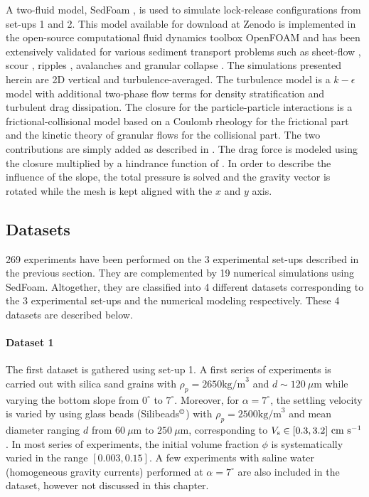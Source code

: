\documentclass[12pt]{article}
\begin{document}
A two-fluid model, SedFoam \citep{chauchat2017}, is used to simulate lock-release configurations from set-ups 1 and 2. This model available for download at Zenodo \citep{bonamy2023} is implemented in the open-source computational fluid dynamics toolbox OpenFOAM and has been extensively validated for various sediment transport problems such as sheet-flow \citep{cheng2016,chauchat2022,mathieu2021,mathieu2022}, scour \citep{nagel2020,tsai2022}, ripples \citep{salimi2021a,salimi2021b}, avalanches \citep{montella2021} and granular collapse \citep{montella2023}. The simulations presented herein are 2D vertical and turbulence-averaged. The turbulence model is a $k-\epsilon$ model with additional two-phase flow terms for density stratification and turbulent drag dissipation. The closure for the particle-particle interactions is a frictional-collisional model based on a Coulomb rheology for the frictional part and the kinetic theory of granular flows for the collisional part. The two contributions are simply added as described in \cite{chauchat2017}. The drag force is modeled using the \cite{schiller1933} closure multiplied by a hindrance function of \cite{richardson1954}. In order to describe the influence of the slope, the total pressure is solved and the gravity vector is rotated while the mesh is kept aligned with the $x$ and $y$ axis.

\subsection{Datasets}
\label{sec:datasets}

269 experiments have been performed on the 3 experimental set-ups described in the previous section. They are complemented by 19 numerical simulations using SedFoam. Altogether, they are classified into 4 different datasets corresponding to the 3 experimental set-ups and the numerical modeling respectively. These 4 datasets are described below.

\paragraph{Dataset 1}

The first dataset is gathered using set-up 1. A first series of experiments is carried out with silica sand grains with $\rho_p=2650\textrm{kg/m}^{3}$ and $d \sim 120~\mu\textrm{m}$ while varying the bottom slope from $0^\circ$ to $7^\circ$. Moreover, for $\alpha = 7^\circ$, the settling velocity is varied by using glass beads (Silibeads$^\copyright$) with $\rho_p=2500\textrm{kg/m}^{3}$ and mean diameter ranging $d$ from $60~\mu\textrm{m}$ to $250~\mu\textrm{m}$, corresponding to $V_{\text s} \in [0.3, 3.2]~\textrm{cm}~\textrm{s}^{-1}$. In most series of experiments, the initial volume fraction $\phi$  is systematically varied in the range $[0.003, 0.15]$.
%
A few experiments with saline water (homogeneous gravity currents) performed at $\alpha=7^\circ$ are also included in the dataset, however not discussed in this chapter.
\end{document}
